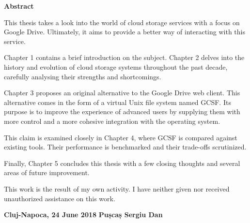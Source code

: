 \documentclass[a4paper]{article}
\begin{document}

\begin{center}
\Large\textbf{Abstract}
\end{center}

\hspace{10pt}

\normalsize

This thesis takes a look into the world of cloud storage services with a focus on Google Drive. Ultimately, it aims to provide a better way of interacting with this service.

\hspace{10pt}

Chapter 1 contains a brief introduction on the subject. Chapter 2 delves into the history and evolution of cloud storage systems throughout the past decade, carefully analysing their strengths and shortcomings.

\hspace{10pt}

Chapter 3 proposes an original alternative to the Google Drive web client. This alternative comes in the form of a virtual Unix file system named GCSF. Its purpose is to improve the experience of advanced users by supplying them with more control and a more cohesive integration with the operating system.

\hspace{10pt}

This claim is examined closely in Chapter 4, where GCSF is compared against existing tools. Their performance is benchmarked and their trade-offs scrutinized.

\hspace{10pt}

Finally, Chapter 5 concludes this thesis with a few closing thoughts and several areas of future improvement.

\hspace{10pt}

This work is the result of my own activity. I have neither given nor received unauthorized assistance on this work.

\hspace{10pt}

\parindent0pt
\textbf{Cluj-Napoca, 24 June 2018}
\hfill
\textbf{Pușcaș Sergiu Dan} \\
\hfill
\end{document}
